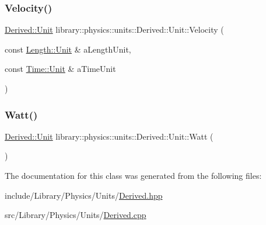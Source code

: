 \mbox{\label{classlibrary_1_1physics_1_1units_1_1_derived_1_1_unit_a14a4c4646fc7af71b1b295039526c7a1}} 
\subsubsection{\texorpdfstring{Velocity()}{Velocity()}}
{\footnotesize\ttfamily \hyperlink{classlibrary_1_1physics_1_1units_1_1_derived_1_1_unit}{Derived\+::\+Unit} library\+::physics\+::units\+::\+Derived\+::\+Unit\+::\+Velocity (\begin{DoxyParamCaption}\item[{const \hyperlink{classlibrary_1_1physics_1_1units_1_1_length_a3b8b39cd245cf6b19dc34459baeccb18}{Length\+::\+Unit} \&}]{a\+Length\+Unit,  }\item[{const \hyperlink{classlibrary_1_1physics_1_1units_1_1_time_ab876a6a05c9a2f28905f2753bfd64109}{Time\+::\+Unit} \&}]{a\+Time\+Unit }\end{DoxyParamCaption})\hspace{0.3cm}{\ttfamily [static]}}

\mbox{\label{classlibrary_1_1physics_1_1units_1_1_derived_1_1_unit_a242bb2e90f24200686e272312a2b05a9}} 
\subsubsection{\texorpdfstring{Watt()}{Watt()}}
{\footnotesize\ttfamily \hyperlink{classlibrary_1_1physics_1_1units_1_1_derived_1_1_unit}{Derived\+::\+Unit} library\+::physics\+::units\+::\+Derived\+::\+Unit\+::\+Watt (\begin{DoxyParamCaption}{ }\end{DoxyParamCaption})\hspace{0.3cm}{\ttfamily [static]}}



The documentation for this class was generated from the following files\+:\begin{DoxyCompactItemize}
\item 
include/\+Library/\+Physics/\+Units/\hyperlink{_derived_8hpp}{Derived.\+hpp}\item 
src/\+Library/\+Physics/\+Units/\hyperlink{_derived_8cpp}{Derived.\+cpp}\end{DoxyCompactItemize}

